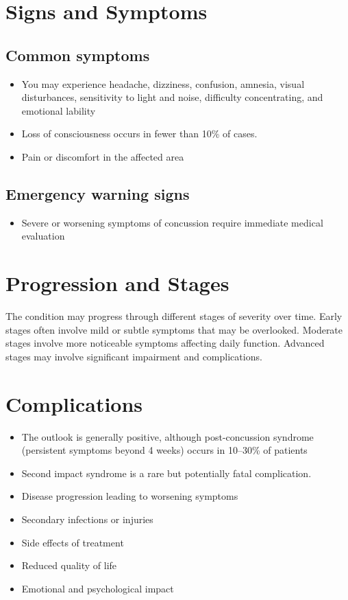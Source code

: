 \section{Signs and Symptoms}
\subsection{Common symptoms}
\begin{itemize}[noitemsep]
  \item You may experience headache, dizziness, confusion, amnesia, visual disturbances, sensitivity to light and noise, difficulty concentrating, and emotional lability
  \item Loss of consciousness occurs in fewer than 10\% of cases.
  \item Pain or discomfort in the affected area
  \end{itemize}
\subsection{Emergency warning signs}
\begin{itemize}[noitemsep]
  \item Severe or worsening symptoms of concussion require immediate medical evaluation
\end{itemize}
\section{Progression and Stages}
The condition may progress through different stages of severity over time. Early stages often involve mild or subtle symptoms that may be overlooked. Moderate stages involve more noticeable symptoms affecting daily function. Advanced stages may involve significant impairment and complications.
\section{Complications}
\begin{itemize}[noitemsep]
  \item The outlook is generally positive, although post-concussion syndrome (persistent symptoms beyond 4 weeks) occurs in 10--30\% of patients
  \item Second impact syndrome is a rare but potentially fatal complication.
  \item Disease progression leading to worsening symptoms
  \item Secondary infections or injuries
  \item Side effects of treatment
  \item Reduced quality of life
  \item Emotional and psychological impact
\end{itemize}
